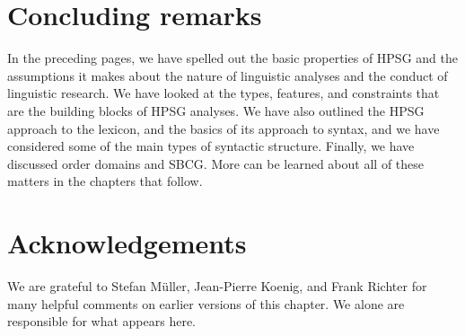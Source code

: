 \documentclass[output=paper
	        ,collection
	        ,collectionchapter
 	        ,biblatex
                ,babelshorthands
                ,newtxmath
                ,draftmode
                ,colorlinks, citecolor=brown
]{langscibook}
\begin{document}
\section{Concluding remarks}\label{sec:prop8}

In the preceding pages, we have spelled out the basic properties of HPSG and the assumptions it makes about the nature of linguistic analyses and the conduct of linguistic research. We have looked at the types, features, and constraints that are the building blocks of HPSG analyses. We have also outlined the HPSG approach to the lexicon, and the basics of its approach to syntax, and we have considered some of the main types of syntactic structure. Finally, we have discussed order domains and SBCG. More can be learned about all of these matters in the chapters that follow.


\section*{Acknowledgements}

We are grateful to Stefan Müller, Jean-Pierre Koenig, and Frank Richter for many helpful comments on
earlier versions of this chapter. We alone are responsible for what appears here.



{\sloppy
\printbibliography[heading=subbibliography,notkeyword=this]
}
\end{document}
